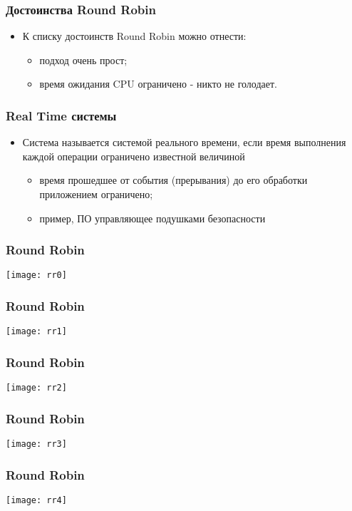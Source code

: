 \begin{frame}
\frametitle{Достоинства Round Robin}
\begin{itemize}
    \item<1->К списку достоинств Round Robin можно отнести:
    \begin{itemize}
        \item<2->подход очень прост;
        \item<3->время ожидания CPU ограничено - никто не голодает.
    \end{itemize}
\end{itemize}
\end{frame}

\begin{frame}
\frametitle{Real Time системы}
\begin{itemize}
    \item<1->Система называется системой реального времени, если время
         выполнения каждой операции ограничено известной величиной
    \begin{itemize}
        \item<2->время прошедшее от события (прерывания) до его обработки
             приложением ограничено;
        \item<3->пример, ПО управляющее подушками безопасности 
    \end{itemize}
\end{itemize}
\end{frame}

\begin{frame}
\frametitle{Round Robin}
\texttt{[image: rr0]}
\end{frame}

\begin{frame}
\frametitle{Round Robin}
\texttt{[image: rr1]}
\end{frame}

\begin{frame}
\frametitle{Round Robin}
\texttt{[image: rr2]}
\end{frame}

\begin{frame}
\frametitle{Round Robin}
\texttt{[image: rr3]}
\end{frame}

\begin{frame}
\frametitle{Round Robin}
\texttt{[image: rr4]}
\end{frame}

